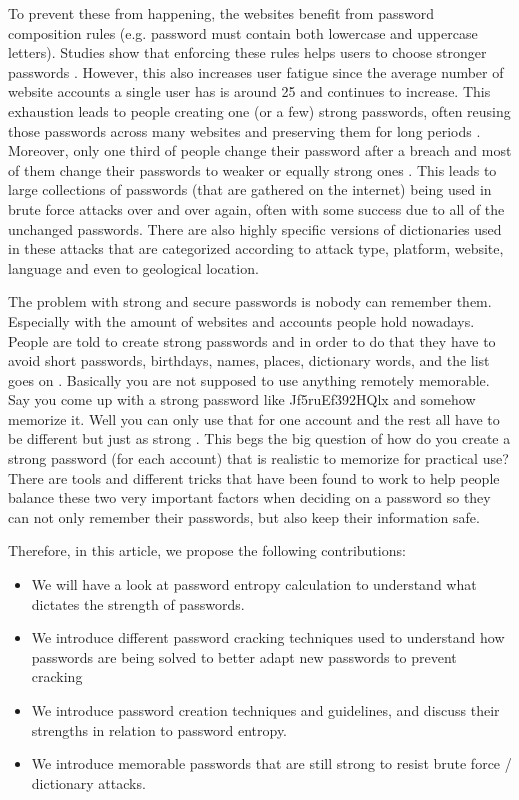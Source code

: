 \documentclass[acmsmall,nonacm]{acmart}
\begin{document}
To prevent these from happening, the websites benefit from password composition rules (e.g. password must contain both lowercase and uppercase letters). Studies show that enforcing these rules helps users to choose stronger passwords \cite{shay_2010}. However, this also increases user fatigue since the average number of website accounts a single user has is around 25 \cite{lee_2014,waugh_2012}  and continues to increase. This exhaustion leads to people creating one (or a few) strong passwords, often reusing those passwords across many websites \cite{das_2014} and preserving them for long periods \cite{bhagavatula_2020,florencio_2007}. Moreover, only one third of people change their password after a breach and most of them change their passwords to weaker or equally strong ones \cite{bhagavatula_2020}. This leads to large collections of passwords (that are gathered on the internet) being used in brute force attacks over and over again, often with some success due to all of the unchanged passwords. There are also highly specific versions of dictionaries used in these attacks that are categorized according to attack type, platform, website, language and even to geological location.


The problem with strong and secure passwords is nobody can remember them. Especially with the amount of websites and accounts people hold nowadays. People are told to create strong passwords and in order to do that they have to avoid short passwords, birthdays, names, places, dictionary words, and the list goes on \cite{lee_2014}. Basically you are not supposed to use anything remotely memorable. Say you come up with a strong password like Jf5ruEf392HQlx and somehow memorize it. Well you can only use that for one account and the rest all have to be different but just as strong \cite{rubenking_2021}. This begs the big question of how do you create a strong password (for each account) that is realistic to memorize for practical use? There are tools and different tricks that have been found to work to help people balance these two very important factors when deciding on a password so they can not only remember their passwords, but also keep their information safe.

Therefore, in this article, we propose the following contributions:

\begin{itemize}
\item We will have a look at password entropy calculation to understand what dictates the strength of passwords.
\item We introduce different password cracking techniques used to understand how passwords are being solved to better adapt new passwords to prevent cracking
\item We introduce password creation techniques and guidelines, and discuss their strengths in relation to password entropy.
\item We introduce memorable passwords that are still strong to resist brute force / dictionary attacks.
\end{itemize}
\end{document}
